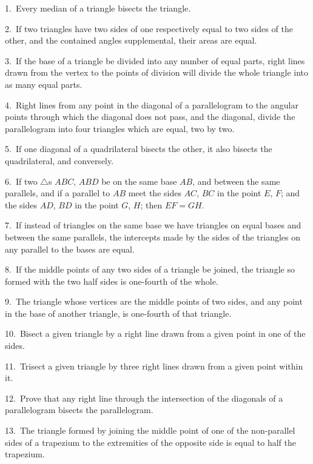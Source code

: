 \documentclass[oneside]{book}
\begin{document}
\begin{footnotesize}
1.~Every median of a triangle bisects the triangle.

2.~If two triangles have two sides of one respectively equal to
two sides of the other, and the contained angles supplemental,
their areas are equal.

3.~If the base of a triangle be divided into any number of equal
parts, right lines drawn from the vertex to the points of division
will divide the whole triangle into as many equal parts.

4.~Right lines from any point in the diagonal of a parallelogram
to the angular points through which the diagonal does not
pass, and the diagonal, divide the parallelogram into four triangles
which are equal, two by two.

5.~If one diagonal of a quadrilateral bisects the other, it also
bisects the quadrilateral, and conversely.

6.~If two $\triangle$s $ABC$, $ABD$ be on the same base $AB$, and between
the same parallels, and if a parallel to $AB$ meet the sides $AC$, $BC$
in the point $E$, $F$; and the sides $AD$, $BD$ in the point $G$, $H$; then
$EF = GH$.

7.~If instead of triangles on the same base we have triangles on
equal bases and between the same parallels, the intercepts made by
the sides of the triangles on any parallel to the bases are equal.

8.~If the middle points of any two sides of a triangle be joined,
the triangle so formed with the two half sides is one-fourth of the
whole.

9.~The triangle whose vertices are the middle points of two
sides, and any point in the base of another triangle, is one-fourth
of that triangle.

10.~Bisect a given triangle by a right line drawn from a given
point in one of the sides.

11.~Trisect a given triangle by three right lines drawn from a
given point within it.



12.~Prove that any right line through the intersection of the
diagonals of a parallelogram bisects the parallelogram\label{parallellogram}.

13.~The triangle formed by joining the middle point of one of
the non-parallel sides of a trapezium to the extremities of the
opposite side is equal to half the trapezium.
\par\end{footnotesize}
\end{document}
